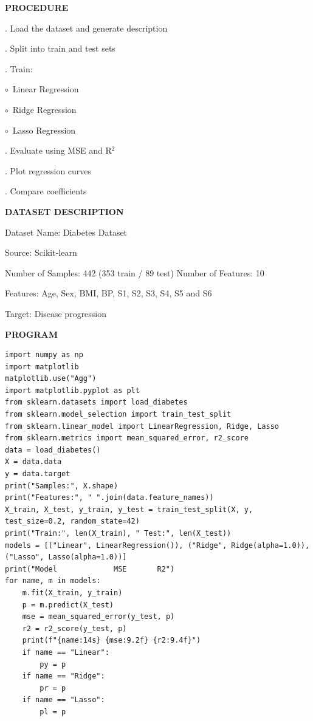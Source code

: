 \documentclass[11pt,twoside]{article}
\newcommand{\expheading}[1]{{\fontsize{14}{17}\selectfont\textbf{#1}\par}}
\newcommand{\toevenpage}{\clearpage\ifodd\value{page}\null\thispagestyle{empty}\newpage\fi}
\begin{document}
{\expheading{PROCEDURE}
\vspace{4pt}
. Load the dataset and generate description\par
{}. Split into train and test sets\par
{}. Train:\par
\noindent\hspace*{0.55cm}$\circ$~Linear Regression\par
\noindent\hspace*{0.55cm}$\circ$~Ridge Regression\par
\noindent\hspace*{0.55cm}$\circ$~Lasso Regression\par
{}. Evaluate using MSE and R$^2$\par
{}. Plot regression curves\par
{}. Compare coefficients \par
\vspace{4pt}

\expheading{DATASET DESCRIPTION}
\vspace{4pt}
\noindent Dataset Name: Diabetes Dataset\par
\noindent Source: Scikit-learn\par
\noindent Number of Samples: 442 (353 train / 89 test) \hspace{0.3cm} Number of Features: 10\par
\noindent Features: Age, Sex, BMI, BP, S1, S2, S3, S4, S5 and S6\par
\noindent Target: Disease progression \par
\vspace{4pt}
} %
\toevenpage
\expheading{PROGRAM}
\vspace{6pt}

\begin{lstlisting}
import numpy as np
import matplotlib
matplotlib.use("Agg")
import matplotlib.pyplot as plt
from sklearn.datasets import load_diabetes
from sklearn.model_selection import train_test_split
from sklearn.linear_model import LinearRegression, Ridge, Lasso
from sklearn.metrics import mean_squared_error, r2_score
data = load_diabetes()
X = data.data
y = data.target
print("Samples:", X.shape)
print("Features:", " ".join(data.feature_names))
X_train, X_test, y_train, y_test = train_test_split(X, y, test_size=0.2, random_state=42)
print("Train:", len(X_train), " Test:", len(X_test))
models = [("Linear", LinearRegression()), ("Ridge", Ridge(alpha=1.0)), ("Lasso", Lasso(alpha=1.0))]
print("Model             MSE       R2")
for name, m in models:
    m.fit(X_train, y_train)
    p = m.predict(X_test)
    mse = mean_squared_error(y_test, p)
    r2 = r2_score(y_test, p)
    print(f"{name:14s} {mse:9.2f} {r2:9.4f}")
    if name == "Linear":
        py = p
    if name == "Ridge":
        pr = p
    if name == "Lasso":
        pl = p
\end{lstlisting}
\end{document}
